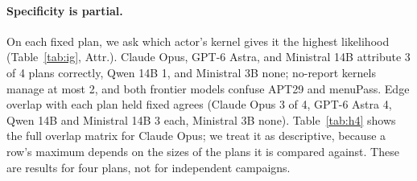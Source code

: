 \documentclass[letterpaper]{article} %
\begin{document}
\paragraph{Specificity is partial.} On each fixed plan, we ask which actor's kernel gives it the highest likelihood (Table~\ref{tab:ig}, Attr.). Claude Opus, GPT-6 Astra, and Ministral 14B attribute 3 of 4 plans correctly, Qwen 14B 1, and Ministral 3B none; no-report kernels manage at most 2, and both frontier models confuse APT29 and menuPass. Edge overlap with each plan held fixed agrees (Claude Opus 3 of 4, GPT-6 Astra 4, Qwen 14B and Ministral 14B 3 each, Ministral 3B none). Table~\ref{tab:h4} shows the full overlap matrix for Claude Opus; we treat it as descriptive, because a row's maximum depends on the sizes of the plans it is compared against. These are results for four plans, not for independent campaigns.
\end{document}
